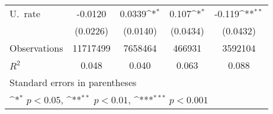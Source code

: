{
\def\sym#1{\ifmmode^{#1}\else\(^{#1}\)\fi}
\begin{tabular}{l*{4}{c}}
\hline\hline
\hline
U.\ rate            &     -0.0120         &      0.0339\sym{*}  &       0.107\sym{*}  &      -0.119\sym{**} \\
                    &    (0.0226)         &    (0.0140)         &    (0.0434)         &    (0.0432)         \\
\hline
Observations        &    11717499         &     7658464         &      466931         &     3592104         \\
\(R^{2}\)           &       0.048         &       0.040         &       0.063         &       0.088         \\
\hline\hline
\multicolumn{5}{l}{\footnotesize Standard errors in parentheses}\\
\multicolumn{5}{l}{\footnotesize \sym{*} \(p<0.05\), \sym{**} \(p<0.01\), \sym{***} \(p<0.001\)}\\
\end{tabular}
}
